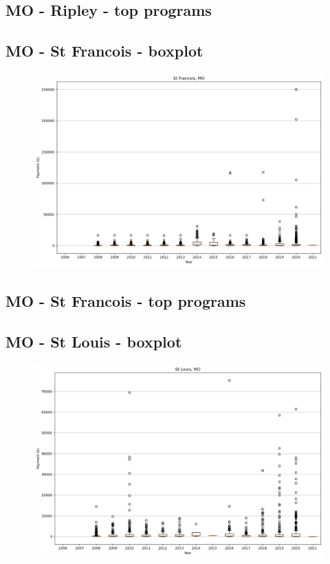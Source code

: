 \subsection*{MO - Ripley - top programs}

\newpage
\subsection*{MO - St Francois - boxplot}
\begin{figure}[h]
\centering
\includegraphics[width=7in]{../output/boxplots/counties/St Francois-MO_boxplot.png}
\end{figure}


\subsection*{MO - St Francois - top programs}

\newpage
\subsection*{MO - St Louis - boxplot}
\begin{figure}[h]
\centering
\includegraphics[width=7in]{../output/boxplots/counties/St Louis-MO_boxplot.png}
\end{figure}


